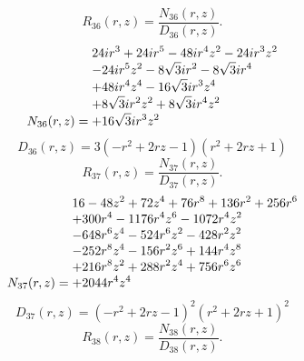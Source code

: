 \documentclass[11pt,a4paper]{article}
\begin{document}
\begin{equation}
R_{36}(r,z)=\frac{N_{36}(r,z)}{D_{36}(r,z)}.
\label{eq:cat-rational-36}
\end{equation}
\begin{equation}
N_{36}(r,z)=\shortstack[l]{$\displaystyle 24 i r^{3} + 24 i r^{5} - 48 i r^{4} z^{2} - 24 i r^{3} z^{2}$\\
$\displaystyle  - 24 i r^{5} z^{2} - 8 \sqrt{3} i r^{2} - 8 \sqrt{3} i r^{4}$\\
$\displaystyle  + 48 i r^{4} z^{4} - 16 \sqrt{3} i r^{3} z^{4}$\\
$\displaystyle  + 8 \sqrt{3} i r^{2} z^{2} + 8 \sqrt{3} i r^{4} z^{2}$\\
$\displaystyle  + 16 \sqrt{3} i r^{3} z^{2}$}
\label{eq:cat-numerator-36}
\end{equation}
\begin{equation}
D_{36}(r,z)=3 \left(- r^{2} + 2 r z - 1\right) \left(r^{2} + 2 r z + 1\right)
\label{eq:cat-denominator-36}
\end{equation}
\begin{equation}
R_{37}(r,z)=\frac{N_{37}(r,z)}{D_{37}(r,z)}.
\label{eq:cat-rational-37}
\end{equation}
\begin{equation}
N_{37}(r,z)=\shortstack[l]{$\displaystyle 16 - 48 z^{2} + 72 z^{4} + 76 r^{8} + 136 r^{2} + 256 r^{6}$\\
$\displaystyle  + 300 r^{4} - 1176 r^{4} z^{6} - 1072 r^{4} z^{2}$\\
$\displaystyle  - 648 r^{6} z^{4} - 524 r^{6} z^{2} - 428 r^{2} z^{2}$\\
$\displaystyle  - 252 r^{8} z^{4} - 156 r^{2} z^{6} + 144 r^{4} z^{8}$\\
$\displaystyle  + 216 r^{8} z^{2} + 288 r^{2} z^{4} + 756 r^{6} z^{6}$\\
$\displaystyle  + 2044 r^{4} z^{4}$}
\label{eq:cat-numerator-37}
\end{equation}
\begin{equation}
D_{37}(r,z)=\left(- r^{2} + 2 r z - 1\right)^{2} \left(r^{2} + 2 r z + 1\right)^{2}
\label{eq:cat-denominator-37}
\end{equation}
\begin{equation}
R_{38}(r,z)=\frac{N_{38}(r,z)}{D_{38}(r,z)}.
\label{eq:cat-rational-38}
\end{equation}
\end{document}
